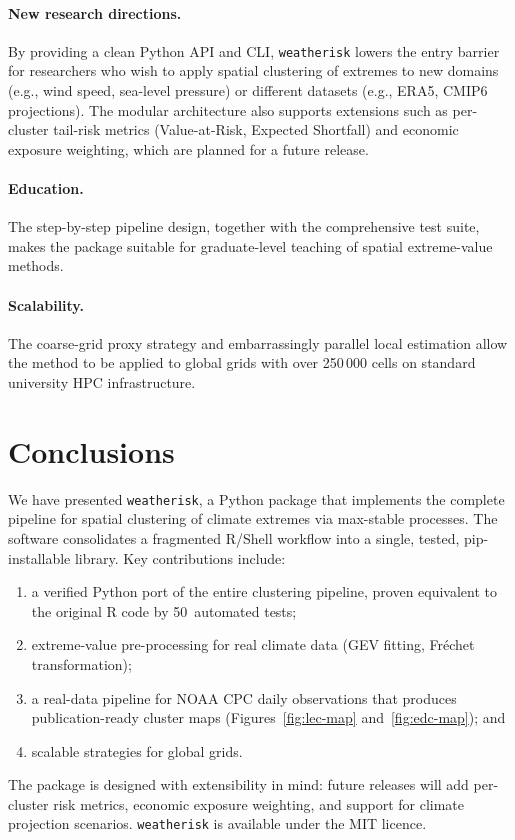 \documentclass[preprint,12pt,a4paper]{elsarticle}
\begin{document}
\paragraph{New research directions.}
By providing a clean Python API and CLI, \texttt{weatherisk} lowers
the entry barrier for researchers who wish to apply spatial
clustering of extremes to new domains (e.g., wind speed, sea-level
pressure) or different datasets (e.g., ERA5, CMIP6 projections).
The modular architecture also supports extensions such as
per-cluster tail-risk metrics (Value-at-Risk, Expected Shortfall)
and economic exposure weighting, which are planned for a future
release.

\paragraph{Education.}
The step-by-step pipeline design, together with the comprehensive
test suite, makes the package suitable for graduate-level teaching
of spatial extreme-value methods.

\paragraph{Scalability.}
The coarse-grid proxy strategy and embarrassingly parallel local
estimation allow the method to be applied to global grids with
over 250\,000 cells on standard university HPC infrastructure.

\section{Conclusions}
\label{sec:conclusions}

We have presented \texttt{weatherisk}, a Python package that
implements the complete pipeline for spatial clustering of climate
extremes via max-stable processes.  The software consolidates a
fragmented R/Shell workflow into a single, tested, pip-installable
library.  Key contributions include:
\begin{enumerate}
\item a verified Python port of the entire clustering pipeline,
  proven equivalent to the original R code by 50~automated tests;
\item extreme-value pre-processing for real climate data (GEV
  fitting, Fr\'{e}chet transformation);
\item a real-data pipeline for NOAA CPC daily observations that
  produces publication-ready cluster maps
  (Figures~\ref{fig:lec-map} and~\ref{fig:edc-map}); and
\item scalable strategies for global grids.
\end{enumerate}
The package is designed with extensibility in mind: future releases
will add per-cluster risk metrics, economic exposure weighting, and
support for climate projection scenarios.  \texttt{weatherisk} is
available under the MIT licence.
\end{document}
